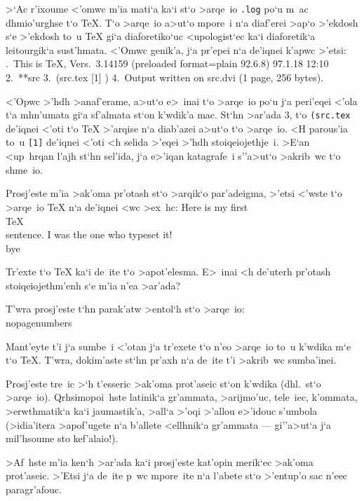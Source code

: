 >`Ac r'ixoume <'omwc m'ia mati`a ka`i st`o >arqe~io {\tt .log} po`u m~ac
dhmio'urghse t`o {\rm\TeX}\null.  T`o >ar\-qe~io a>ut`o mpore~i n`a      
diaf'erei >ap`o >'ekdosh s`e >'ekdosh to~u {\rm \TeX} gi`a
diaforetiko`uc <upologist`ec ka`i diaforetik`a leitourgik`a sust'hmata.  
<'Omwc genik'a, j`a pr'epei n`a de'iqnei k'apwc >'etsi:
.\ This is TeX, Vers.\ 3.14159 (preloaded format=plain 92.6.8) 97.1.18 12:10
2.\ **src
3.\ (src.tex [1] )
4.\ Output written on src.dvi (1 page, 256 bytes).
\enduser

<'Opwc >'hdh >anaf'erame, a>ut`o e>~inai t`o >arqe~io po`u j`a          
peri'eqei <'ola t`a mhn'umata gi`a sf'al\-mata st`on k'wdik'a mac. St`hn
>ar'ada 3, t`o {\tt (src.tex\ } de'iqnei <'oti t`o {\rm \TeX} >'arqise
n`a diab'azei a>ut`o t`o >arqe~io.  <H parous'ia to~u {\tt [1]} de'iqnei
<'oti <h selida >'eqei >'hdh stoiqeiojethje~i. >E`an <up~hrqan
l'ajh st`hn sel'ida, j`a e>'iqan katagrafe~i s''\NB a>ut`o >akrib~wc
t`o shme~io.

\exercise Prosj'este m'ia >ak'oma pr'otash st`o >arqik`o par'adeigma,
>'etsi <'wste t`o >arqe~io {\rm \TeX} n`a de'iqnei <wc >ex~hc:
\beginuser
Here is my first \\TeX\\ sentence.
I was the one who typeset it!
\\bye
\enduser

\noindent
Tr'exte t`o {\rm \TeX} ka`i de~ite t`o >apot'elesma.  E>~inai <h
de'uterh pr'otash stoiqeiojethm'enh s`e m'ia n'ea >ar'ada?

\exercise T'wra prosj'este t`hn parak'atw >entol`h st`o >arqe~io:
\beginuser
\\nopagenumbers
\enduser

\noindent 
Mant'eyte t'i j`a sumbe~i <'otan j`a tr'exete t`o n'eo >arqe~io to~u
k'wdika m`e t`o {\rm \TeX}\null.  T'wra, doki\-m'aste st`hn pr'axh n`a
de~ite t'i >akrib~wc sumba'inei.

\exercise Prosj'este tre~ic >`h t'esseric >ak'oma prot'aseic st`on     
k'wdika (dhl.\ st`o >arqe~io).  Qrhsimopoi~hste latinik`a gr'ammata,
>arijmo'uc, tele~iec, k'ommata, >erwthmatik`a ka`i jau\-ma\-sti\-k'a,
>all`a >'oqi >'allou e>'idouc s'umbola (>idia'itera >apof'ugete n`a
b'al\-lete <ellhnik`a gr'am\-ma\-ta --- gi''\NB a>ut`a j`a mil'hsoume
sto kef'alaio!).

\exercise >Af~hste m'ia ken`h >ar'ada ka`i prosj'este kat'opin merik`ec 
>ak'oma prot'aseic.  >'Etsi j`a de~ite p~wc mpore~ite n`a l'abete st`o
>'entup'o sac n'eec paragr'afouc.                
\medskip

